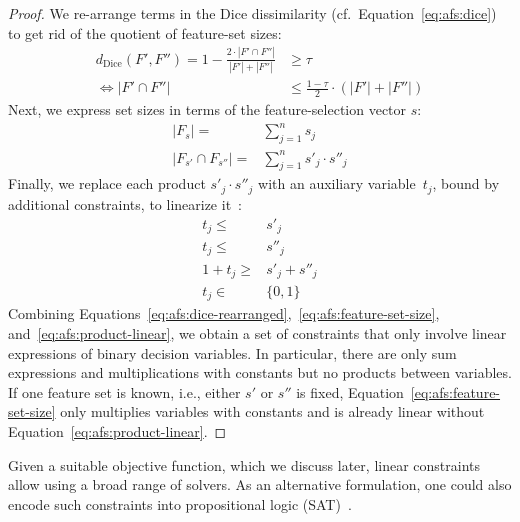 \documentclass{article}
\theoremstyle{definition}
\begin{document}
\begin{proof}
We re-arrange terms in the Dice dissimilarity (cf.~Equation~\ref{eq:afs:dice}) to get rid of the quotient of feature-set sizes:
%
\begin{equation}
	\begin{aligned}
		d_{\text{Dice}}(F',F'') = 1 - \frac{2 \cdot |F' \cap F''|}{|F'| + |F''|} &\geq \tau \\
		\Leftrightarrow |F' \cap F''| &\leq \frac{1 - \tau}{2} \cdot (|F'| + |F''|)
	\end{aligned}
	\label{eq:afs:dice-rearranged}
\end{equation}
%
Next, we express set sizes in terms of the feature-selection vector $s$:
%
\begin{equation}
	\begin{aligned}
		|F_s| =& \sum_{j=1}^n s_j \\
		|F_{s'} \cap F_{s''}| =& \sum_{j=1}^n s'_j \cdot s''_j
	\end{aligned}
	\label{eq:afs:feature-set-size}
\end{equation}
%
Finally, we replace each product $s'_j \cdot s''_j$ with an auxiliary variable~$t_j$, bound by additional constraints, to linearize it~\cite{mosek2022modeling}:
%
\begin{equation}
	\begin{aligned}
		t_j \leq& s'_j \\
		t_j \leq& s''_j \\
		1 + t_j \geq& s'_j + s''_j \\
		t_j \in& \{0,1\}
	\end{aligned}
	\label{eq:afs:product-linear}
\end{equation}
%
Combining Equations~\ref{eq:afs:dice-rearranged},~\ref{eq:afs:feature-set-size}, and~\ref{eq:afs:product-linear}, we obtain a set of constraints that only involve linear expressions of binary decision variables.
In particular, there are only sum expressions and multiplications with constants but no products between variables.
If one feature set is known, i.e., either $s'$ or $s''$ is fixed, Equation~\ref{eq:afs:feature-set-size} only multiplies variables with constants and is already linear without Equation~\ref{eq:afs:product-linear}.
\end{proof}
%
Given a suitable objective function, which we discuss later, linear constraints allow using a broad range of solvers.
As an alternative formulation, one could also encode such constraints into propositional logic (\textsc{SAT})~\cite{ulrich2022selecting}.
\end{document}
